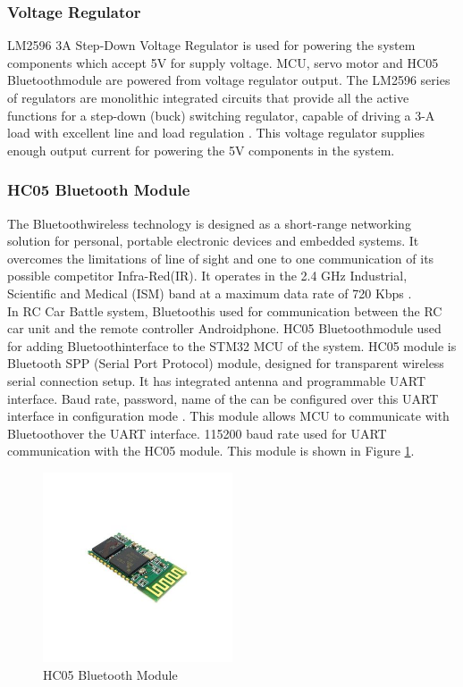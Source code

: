 \subsubsection{Voltage Regulator}
LM2596 3A Step-Down Voltage Regulator is used for powering the system components which accept 5V for supply voltage. MCU, servo motor and HC05 Bluetooth\texttrademark\;module are powered from voltage regulator output. The LM2596 series of regulators are monolithic
integrated circuits that provide all the active functions for a step-down (buck) switching regulator, capable of driving a 3-A load with excellent line and load
regulation \cite{Three}. This voltage regulator supplies enough output current for powering the 5V components in the system.

\subsubsection{HC05 Bluetooth Module} \label{sec_hc05_module}
The Bluetooth\texttrademark\;wireless technology is designed as a short-range networking solution for personal, portable electronic devices and embedded systems. It overcomes the limitations of line of sight and one to one communication of its possible competitor Infra-Red(IR). It operates in the 2.4 GHz Industrial, Scientific and Medical (ISM) band at a maximum data rate of 720 Kbps \cite{Bluetooth_Overview}. \\

In RC Car Battle system, Bluetooth\texttrademark\;is used for communication between the RC car unit and the remote controller Android\texttrademark\;phone. HC05 Bluetooth\texttrademark\;module used for adding Bluetooth\texttrademark\;interface to the STM32 MCU of the system. HC05 module is Bluetooth SPP (Serial Port Protocol) module, designed for transparent wireless serial connection setup. It has integrated antenna and programmable UART interface. Baud rate, password, name of the can be configured over this UART interface in configuration mode \cite{HC05_datasheet}. This module allows MCU to communicate with Bluetooth\texttrademark\;over the UART interface. 115200 baud rate used for UART communication with the HC05 module. This module is shown in Figure \ref{fig:hc05_module}. \\ 

\begin{figure}[!htbp]
    \centering
    \includegraphics[width=0.5\textwidth]{Imgs/400px-HC-05.jpg}
    \caption{\label{fig:hc05_module}HC05 Bluetooth\texttrademark\; Module \cite{HC05_datasheet}}
\end{figure}

